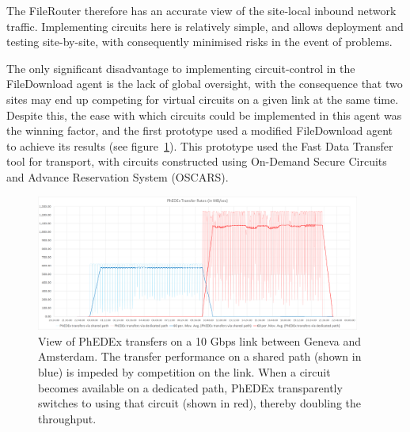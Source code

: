 The FileRouter therefore has an accurate view of the site-local inbound network traffic. Implementing circuits here is relatively simple, and allows deployment and testing site-by-site, with consequently minimised risks in the event of problems.

The only significant disadvantage to implementing circuit-control in the FileDownload agent is the lack of global oversight, with the consequence that two sites may end up competing for virtual circuits on a given link at the same time. Despite this, the ease with which circuits could be implemented in this agent was the winning factor, and the first prototype used a modified FileDownload agent to achieve its results (see figure~\ref{fig:combined_phedex_transfers}). This prototype used the Fast Data Transfer tool\cite{FDT} for transport, with circuits constructed using On-Demand Secure Circuits and Advance Reservation System (OSCARS\cite{OSCARS}).

\begin{figure}[h]
  \centering
  \includegraphics[width=0.95\textwidth]{figure-FileDownload_All_paths}
  \caption{View of PhEDEx transfers on a 10 Gbps link between Geneva and Amsterdam. The transfer performance on a shared path (shown in blue) is impeded by competition on the link. When a circuit becomes available on a dedicated path, PhEDEx transparently switches to using that circuit (shown in red), thereby doubling the throughput.}
  \label{fig:combined_phedex_transfers}
\end{figure} 
